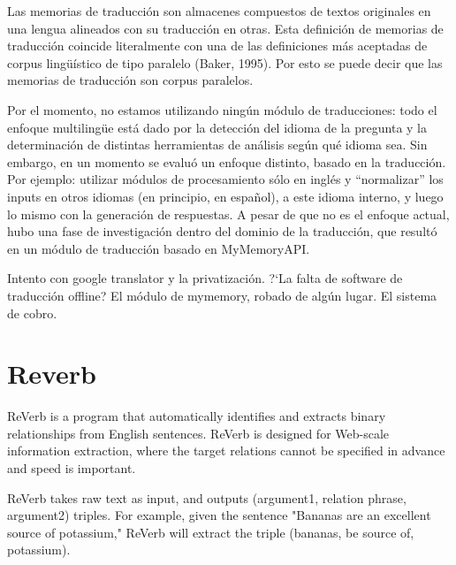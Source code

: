 Las memorias de traducción son almacenes compuestos de textos originales en una lengua alineados con su traducción en otras. Esta definición de memorias de traducción coincide literalmente con una de las definiciones más aceptadas de corpus lingüístico de tipo paralelo (Baker, 1995). Por esto se puede decir que las memorias de traducción son corpus paralelos.


Por el momento, no estamos utilizando ningún módulo de traducciones:
todo el enfoque multilingüe está dado por la detección del idioma
de la pregunta y la determinación de distintas herramientas de
análisis según qué idioma sea. Sin embargo, en un momento se
evaluó un enfoque distinto, basado en la traducción. Por ejemplo:
utilizar módulos de procesamiento sólo en inglés y
{\textquotedblleft}normalizar{\textquotedblright} los inputs en otros
idiomas (en principio, en espa\~nol), a este idioma interno, y luego lo
mismo con la generación de respuestas. A pesar de que no es el
enfoque actual, hubo una fase de investigación dentro del dominio de
la traducción, que resultó en un módulo de traducción basado en
MyMemoryAPI.

Intento con google translator y la privatización. ?`La falta de
software de traducción offline? El módulo de mymemory, robado de
algún lugar. El sistema de cobro. 

\section{Reverb}

ReVerb is a program that automatically identifies and extracts binary relationships from English sentences. ReVerb is designed for Web-scale information extraction, where the target relations cannot be specified in advance and speed is important.

ReVerb takes raw text as input, and outputs (argument1, relation phrase, argument2) triples. For example, given the sentence "Bananas are an excellent source of potassium," ReVerb will extract the triple (bananas, be source of, potassium).

